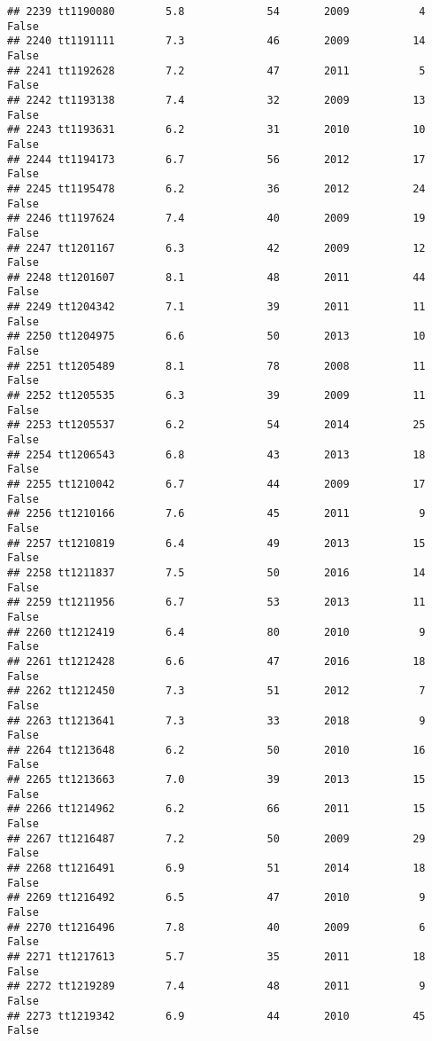\documentclass[
]{article}
\begin{document}
\begin{verbatim}
## 2239 tt1190080        5.8             54       2009           4   False
## 2240 tt1191111        7.3             46       2009          14   False
## 2241 tt1192628        7.2             47       2011           5   False
## 2242 tt1193138        7.4             32       2009          13   False
## 2243 tt1193631        6.2             31       2010          10   False
## 2244 tt1194173        6.7             56       2012          17   False
## 2245 tt1195478        6.2             36       2012          24   False
## 2246 tt1197624        7.4             40       2009          19   False
## 2247 tt1201167        6.3             42       2009          12   False
## 2248 tt1201607        8.1             48       2011          44   False
## 2249 tt1204342        7.1             39       2011          11   False
## 2250 tt1204975        6.6             50       2013          10   False
## 2251 tt1205489        8.1             78       2008          11   False
## 2252 tt1205535        6.3             39       2009          11   False
## 2253 tt1205537        6.2             54       2014          25   False
## 2254 tt1206543        6.8             43       2013          18   False
## 2255 tt1210042        6.7             44       2009          17   False
## 2256 tt1210166        7.6             45       2011           9   False
## 2257 tt1210819        6.4             49       2013          15   False
## 2258 tt1211837        7.5             50       2016          14   False
## 2259 tt1211956        6.7             53       2013          11   False
## 2260 tt1212419        6.4             80       2010           9   False
## 2261 tt1212428        6.6             47       2016          18   False
## 2262 tt1212450        7.3             51       2012           7   False
## 2263 tt1213641        7.3             33       2018           9   False
## 2264 tt1213648        6.2             50       2010          16   False
## 2265 tt1213663        7.0             39       2013          15   False
## 2266 tt1214962        6.2             66       2011          15   False
## 2267 tt1216487        7.2             50       2009          29   False
## 2268 tt1216491        6.9             51       2014          18   False
## 2269 tt1216492        6.5             47       2010           9   False
## 2270 tt1216496        7.8             40       2009           6   False
## 2271 tt1217613        5.7             35       2011          18   False
## 2272 tt1219289        7.4             48       2011           9   False
## 2273 tt1219342        6.9             44       2010          45   False

\end{verbatim}
\end{document}
